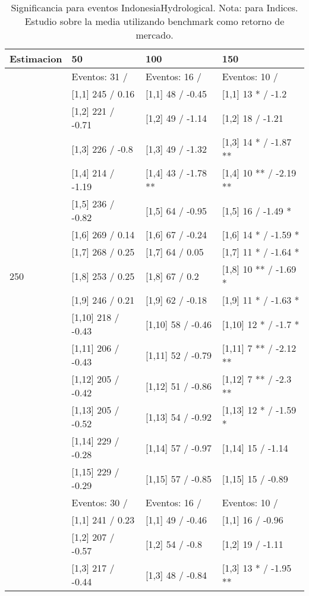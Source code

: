 \begin{table}

\caption{Significancia para eventos IndonesiaHydrological. Nota: para Indices. Estudio sobre la media utilizando benchmark como retorno de mercado.}
\centering
\begin{tabular}[t]{llll}
\toprule
Estimacion & 50 & 100 & 150\\
\midrule
 & Eventos:  31 / & Eventos:  16 / & Eventos:  10 /\\
 & {}[1,1] 245  / 0.16 & {}[1,1] 48  / -0.45 & {}[1,1] 13 * / -1.2\\
 & {}[1,2] 221  / -0.71 & {}[1,2] 49  / -1.14 & {}[1,2] 18  / -1.21\\
 & {}[1,3] 226  / -0.8 & {}[1,3] 49  / -1.32 & {}[1,3] 14 * / -1.87 **\\
 & {}[1,4] 214  / -1.19 & {}[1,4] 43  / -1.78 ** & {}[1,4] 10 ** / -2.19 **\\
\addlinespace
 & {}[1,5] 236  / -0.82 & {}[1,5] 64  / -0.95 & {}[1,5] 16  / -1.49 *\\
 & {}[1,6] 269  / 0.14 & {}[1,6] 67  / -0.24 & {}[1,6] 14 * / -1.59 *\\
 & {}[1,7] 268  / 0.25 & {}[1,7] 64  / 0.05 & {}[1,7] 11 * / -1.64 *\\
250 & {}[1,8] 253  / 0.25 & {}[1,8] 67  / 0.2 & {}[1,8] 10 ** / -1.69 *\\
 & {}[1,9] 246  / 0.21 & {}[1,9] 62  / -0.18 & {}[1,9] 11 * / -1.63 *\\
\addlinespace
 & {}[1,10] 218  / -0.43 & {}[1,10] 58  / -0.46 & {}[1,10] 12 * / -1.7 *\\
 & {}[1,11] 206  / -0.43 & {}[1,11] 52  / -0.79 & {}[1,11] 7 ** / -2.12 **\\
 & {}[1,12] 205  / -0.42 & {}[1,12] 51  / -0.86 & {}[1,12] 7 ** / -2.3 **\\
 & {}[1,13] 205  / -0.52 & {}[1,13] 54  / -0.92 & {}[1,13] 12 * / -1.59 *\\
 & {}[1,14] 229  / -0.28 & {}[1,14] 57  / -0.97 & {}[1,14] 15  / -1.14\\
\addlinespace
 & {}[1,15] 229  / -0.29 & {}[1,15] 57  / -0.85 & {}[1,15] 15  / -0.89\\
 & Eventos:  30 / & Eventos:  16 / & Eventos:  10 /\\
 & {}[1,1] 241  / 0.23 & {}[1,1] 49  / -0.46 & {}[1,1] 16  / -0.96\\
 & {}[1,2] 207  / -0.57 & {}[1,2] 54  / -0.8 & {}[1,2] 19  / -1.11\\
 & {}[1,3] 217  / -0.44 & {}[1,3] 48  / -0.84 & {}[1,3] 13 * / -1.95 **\\

\end{tabular}
\end{table}
